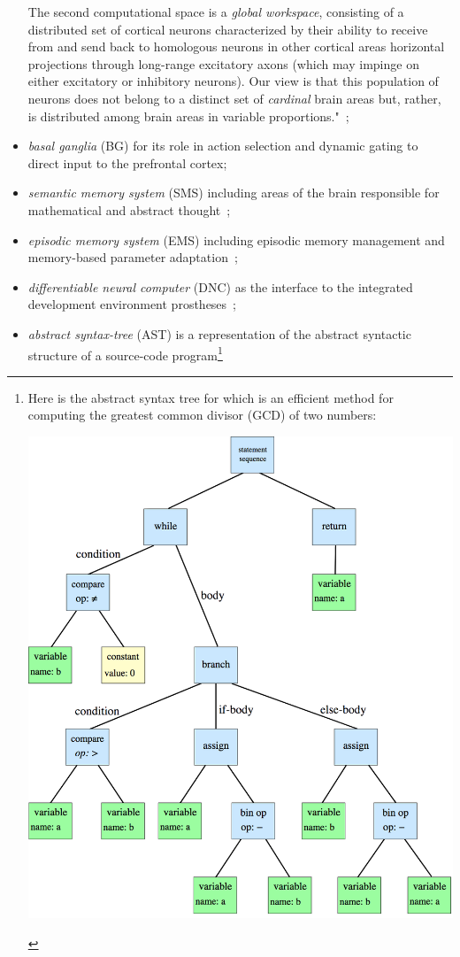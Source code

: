 \begin{itemize}
{    The second computational space is a {\it{global workspace}}, consisting of a distributed set of cortical neurons characterized by their ability to receive from and send back to homologous neurons in other cortical areas horizontal projections through long-range excitatory axons (which may impinge on either excitatory or inhibitory neurons). Our view is that this population of neurons does not belong to a distinct set of {\it{cardinal}} brain areas but, rather, is distributed among brain areas in variable proportions."}~\cite{DehaeneetalPNAS-98,Baars1988};
%
\item {\it{basal ganglia}} (BG) for its role in action selection and dynamic gating to direct input to the prefrontal cortex\cite{OReillyetalLEABRA-16,KrieteetalPNAS-13};
% 
\item {\it{semantic memory system}} (SMS) including areas of the brain responsible for mathematical and abstract thought~\cite{Tulving1972,BinderandDesaiTiCS-11};
%
\item {\it{episodic memory system}} (EMS) including episodic memory management and memory-based parameter adaptation~\cite{SprechmannetalICLR-18,PritzeletalICML-17};
%
\item {\it{differentiable neural computer}} (DNC) as the interface to the integrated development environment prostheses~\cite{GravesetalNATURE-16,GravesetalCoRR-14};
%
\item {\it{abstract syntax-tree}} (AST) is a representation of the abstract syntactic structure of a source-code program\footnote{%
%
  Here is the abstract syntax tree for {} which is an efficient method for computing the greatest common divisor (GCD) of two numbers:
  \begin{center}
    \includegraphics[width=6.0in]{./figures/Euclids_Greatest_Common_Divisor_Method.png}

\end{center}}
\end{itemize}
